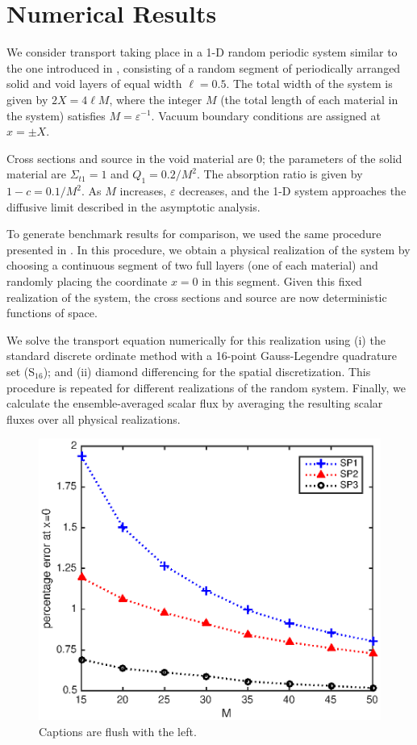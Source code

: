 \documentclass{anstrans}
\begin{document}
\section{Numerical Results}
We consider transport taking place in a 1-D random periodic system similar to the one introduced in \cite{zuc94}, consisting of a random segment of periodically arranged solid and void layers of equal width $\ell=0.5$.
The total width of the system is given by $2X = 4\ell M$, where the integer $M$ (the total length of each material in the system) satisfies $M = \varepsilon^{-1}$.
Vacuum boundary conditions are assigned at $x=\pm X$. 

Cross sections and source in the void material are 0; the parameters of the solid material are $\Sigma_{t1} = 1$ and $Q_1 = 0.2/M^2$.
The absorption ratio is given by $1-c = 0.1/M^2$.
As $M$ increases, $\varepsilon$ decreases, and the 1-D system approaches the diffusive limit described in the asymptotic analysis.

To generate benchmark results for comparison, we used the same procedure presented in \cite{vas16}.
In this procedure, we obtain a physical realization of the system by choosing a continuous segment of two full layers (one of each material) and randomly placing the coordinate $x = 0$ in this segment.
Given this fixed realization of the system, the cross sections and source are now deterministic functions of space.

We solve the transport equation numerically for this realization using (i) the standard discrete ordinate method with a 16-point Gauss-Legendre quadrature set (S$_{16}$); and (ii) diamond differencing for the spatial discretization.
This procedure is repeated for different realizations of the random system.
Finally, we calculate the ensemble-averaged scalar flux by averaging the resulting scalar fluxes over all physical realizations.
\begin{figure}[ht] %
  \centering
  \includegraphics[scale=0.7]{fig_spn}
  \caption{Captions are flush with the left.}
  \label{fig}
\end{figure}
\end{document}
